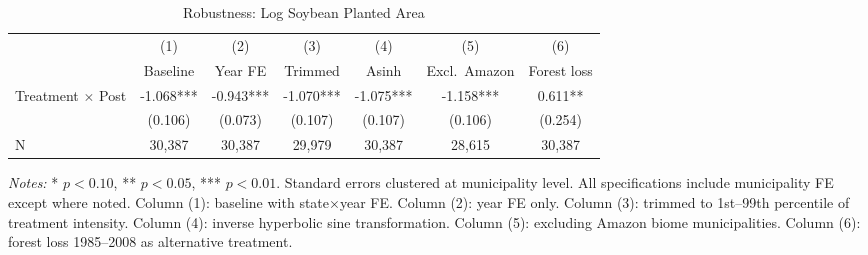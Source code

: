 \begin{table}[H]
\centering
\caption{Robustness: Log Soybean Planted Area}
\begin{threeparttable}
\footnotesize
\begin{tabular}{lcccccc}
\toprule
 & (1) & (2) & (3) & (4) & (5) & (6) \\
 & Baseline & Year FE & Trimmed & Asinh & Excl.~Amazon & Forest loss \\
\midrule
Treatment $\times$ Post & -1.068*** & -0.943*** & -1.070*** & -1.075*** & -1.158*** & 0.611** \\
 & (0.106) & (0.073) & (0.107) & (0.107) & (0.106) & (0.254) \\
\midrule
N & 30,387 & 30,387 & 29,979 & 30,387 & 28,615 & 30,387 \\
\bottomrule
\end{tabular}
\begin{tablenotes}[flushleft]
\small
\item \textit{Notes:} * $p<0.10$, ** $p<0.05$, *** $p<0.01$. Standard errors clustered at municipality level. All specifications include municipality FE except where noted. Column (1): baseline with state$\times$year FE. Column (2): year FE only. Column (3): trimmed to 1st--99th percentile of treatment intensity. Column (4): inverse hyperbolic sine transformation. Column (5): excluding Amazon biome municipalities. Column (6): forest loss 1985--2008 as alternative treatment.
\end{tablenotes}
\end{threeparttable}
\label{tab:robust}
\end{table}

